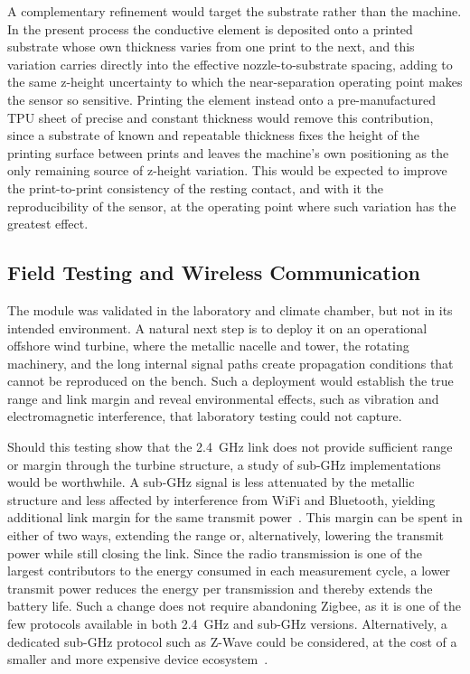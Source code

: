 A complementary refinement would target the substrate rather than the machine. In the present process the conductive element is deposited onto a printed substrate whose own thickness varies from one print to the next, and this variation carries directly into the effective nozzle-to-substrate spacing, adding to the same z-height uncertainty to which the near-separation operating point makes the sensor so sensitive. Printing the element instead onto a pre-manufactured TPU sheet of precise and constant thickness would remove this contribution, since a substrate of known and repeatable thickness fixes the height of the printing surface between prints and leaves the machine's own positioning as the only remaining source of z-height variation. This would be expected to improve the print-to-print consistency of the resting contact, and with it the reproducibility of the sensor, at the operating point where such variation has the greatest effect.

\subsection{Field Testing and Wireless Communication}
The module was validated in the laboratory and climate chamber, but not in its intended environment. A natural next step is to deploy it on an operational offshore wind turbine, where the metallic nacelle and tower, the rotating machinery, and the long internal signal paths create propagation conditions that cannot be reproduced on the bench. Such a deployment would establish the true range and link margin and reveal environmental effects, such as vibration and electromagnetic interference, that laboratory testing could not capture.
 
Should this testing show that the \SI{2.4}{\giga\hertz} link does not provide sufficient range or margin through the turbine structure, a study of sub-\si{\giga\hertz} implementations would be worthwhile. A sub-\si{\giga\hertz} signal is less attenuated by the metallic structure and less affected by interference from WiFi and Bluetooth, yielding additional link margin for the same transmit power~\cite{silabs_subghz_priorities}. This margin can be spent in either of two ways, extending the range or, alternatively, lowering the transmit power while still closing the link. Since the radio transmission is one of the largest contributors to the energy consumed in each measurement cycle, a lower transmit power reduces the energy per transmission and thereby extends the battery life. Such a change does not require abandoning Zigbee, as it is one of the few protocols available in both \SI{2.4}{\giga\hertz} and sub-\si{\giga\hertz} versions. Alternatively, a dedicated sub-\si{\giga\hertz} protocol such as Z-Wave could be considered, at the cost of a smaller and more expensive device ecosystem~\cite{homey_zigbee_vs_zwave}.

